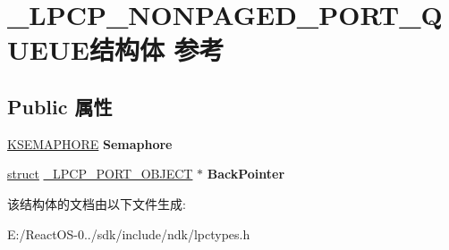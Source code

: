 \hypertarget{struct___l_p_c_p___n_o_n_p_a_g_e_d___p_o_r_t___q_u_e_u_e}{}\section{\+\_\+\+L\+P\+C\+P\+\_\+\+N\+O\+N\+P\+A\+G\+E\+D\+\_\+\+P\+O\+R\+T\+\_\+\+Q\+U\+E\+U\+E结构体 参考}
\label{struct___l_p_c_p___n_o_n_p_a_g_e_d___p_o_r_t___q_u_e_u_e}
\subsection*{Public 属性}
\begin{DoxyCompactItemize}
\item 
\mbox{\label{struct___l_p_c_p___n_o_n_p_a_g_e_d___p_o_r_t___q_u_e_u_e_abb5b4f06fe21c8d7e4c51d9ecd65fbd2}} 
\hyperlink{struct___k_s_e_m_a_p_h_o_r_e}{K\+S\+E\+M\+A\+P\+H\+O\+RE} {\bfseries Semaphore}
\item 
\mbox{\label{struct___l_p_c_p___n_o_n_p_a_g_e_d___p_o_r_t___q_u_e_u_e_a6a9ae2530b5ea6c6bb6e38fe0f08f36c}} 
\hyperlink{interfacestruct}{struct} \hyperlink{struct___l_p_c_p___p_o_r_t___o_b_j_e_c_t}{\+\_\+\+L\+P\+C\+P\+\_\+\+P\+O\+R\+T\+\_\+\+O\+B\+J\+E\+CT} $\ast$ {\bfseries Back\+Pointer}
\end{DoxyCompactItemize}


该结构体的文档由以下文件生成\+:\begin{DoxyCompactItemize}
\item 
E\+:/\+React\+O\+S-\/0../sdk/include/ndk/lpctypes.\+h\end{DoxyCompactItemize}
